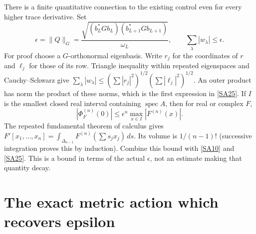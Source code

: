 \documentclass[11pt]{article}
\begin{document}
There is a finite quantitative connection to the existing
control even for every higher trace derivative. Set
\begin{equation}\tag{SA25}\label{SA25}
\epsilon=\|Q\|_G
=\frac{\sqrt{(b_L^*Gb_L)(b_{L+1}^*Gb_{L+1})}}
 {\omega_L},\qquad
\sum_\lambda|w_\lambda|\leq\epsilon .
\end{equation}
For proof choose a $G$-orthonormal eigenbasis.
Write $r_j$ for the coordinates of $r$ and $\ell_j$ for
those of its row. Triangle inequality within repeated
eigenspaces and Cauchy--Schwarz give
$\sum_\lambda|w_\lambda|
\leq(\sum|r_j|^2)^{1/2}(\sum|\ell_j|^2)^{1/2}$.
An outer product has norm the product of these norms,
which is the first expression in \eqref{SA25}.
If $I$ is the smallest closed real interval containing
$\operatorname{spec}A$, then for real or complex $F$,
\begin{equation}\tag{SA26}\label{SA26}
|\Phi_F^{(n)}(0)|
\leq\epsilon^n\max_{x\in I}|F^{(n)}(x)|.
\end{equation}
The repeated fundamental theorem of calculus gives
$F'[x_1,\ldots,x_n]
=\int_{\Delta_{n-1}}F^{(n)}(\sum s_jx_j)\,ds$.
Its volume is $1/(n-1)!$ (successive integration proves
this by induction). Combine this bound with
\eqref{SA10} and \eqref{SA25}. This is a bound in terms
of the actual $\epsilon$, not an estimate making that
quantity decay.

\section{The exact metric action which recovers epsilon}
\end{document}
